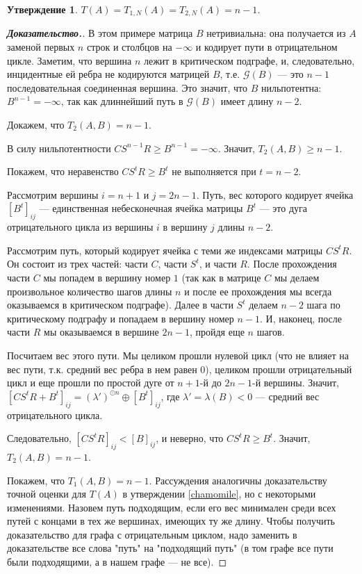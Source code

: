 \documentclass[12pt]{article}
\newtheorem{proposition}[theorem]{Утверждение}
\begin{document}
\begin{proposition}
$T(A) = T_{1, N}(A) = T_{2, N}(A) = n - 1$.
\label{negativeChalomile}
\end{proposition}
\begin{proof}[\textbf{Доказательство.}]
В этом примере матрица $B$ нетривиальна: она получается из $A$ заменой первых $n$ строк и столбцов на $-\infty$ и кодирует пути в отрицательном цикле. Заметим, что вершина $n$ лежит в критическом подграфе, и, следовательно, инцидентные ей ребра не кодируются матрицей $B$, т.е. $\mathcal{G}(B)$ --- это $n - 1$ последовательная соединенная вершина. Это значит, что $B$ нильпотентна: $B^{n - 1} = -\infty$, так как длиннейший путь в $\mathcal{G}(B)$ имеет длину $n - 2$.

Докажем, что $T_2(A, B) = n - 1$.

В силу нильпотентности $CS^{n - 1}R \ge B^{n - 1} = -\infty$. Значит, $T_2(A, B) \ge n - 1$.

Покажем, что неравенство $CS^tR \ge B^t$ не выполняется при $t = n - 2$.

Рассмотрим вершины $i = n + 1$ и $j = 2n - 1$. Путь, вес которого кодирует ячейка $[B^t]_{ij}$ --- единственная небесконечная ячейка матрицы $B^t$ --- это дуга отрицательного цикла из вершины $i$ в вершину $j$ длины $n - 2$.

Рассмотрим путь, который кодирует ячейка с теми же индексами матрицы $CS^tR$. Он состоит из трех частей: части $C$, части $S^t$, и части $R$. После прохождения части $C$ мы попадем в вершину номер $1$ (так как в матрице $C$ мы делаем произвольное количество шагов длины $n$ и после ее прохождения мы всегда оказываемся в критическом подграфе). Далее в части $S^t$ делаем $n - 2$ шага по критическому подграфу и попадаем в вершину номер $n - 1$. И, наконец, после части $R$ мы оказываемся в вершине $2n - 1$, пройдя еще $n$ шагов.

Посчитаем вес этого пути. Мы целиком прошли нулевой цикл (что не влияет на вес пути, т.к. средний вес ребра в нем равен $0$), целиком прошли отрицательный цикл и еще прошли по простой дуге от $n + 1$-й до $2n - 1$-й вершины. Значит, $[CS^tR + B^t]_{ij} = (\lambda')^{\odot n} \oplus [B^t]_{ij}$, где $\lambda' = \lambda(B) < 0$ --- средний вес отрицательного цикла.

Следовательно, $[CS^tR]_{ij} < [B]_{ij}$, и неверно, что $CS^tR \ge B^t$. Значит, $T_2(A, B) = n - 1$.

Покажем, что $T_1(A, B) = n - 1$. Рассуждения аналогичны доказательству точной оценки для $T(A)$ в утверждении \ref{chamomile}, но с некоторыми изменениями. Назовем путь подходящим, если его вес минимален среди всех путей с концами в тех же вершинах, имеющих ту же длину. Чтобы получить доказательство для графа с отрицательным циклом, надо заменить в доказательстве все слова "путь" на "подходящий путь" (в том графе все пути были подходящими, а в нашем графе --- не все).


\end{proof}
\end{document}
